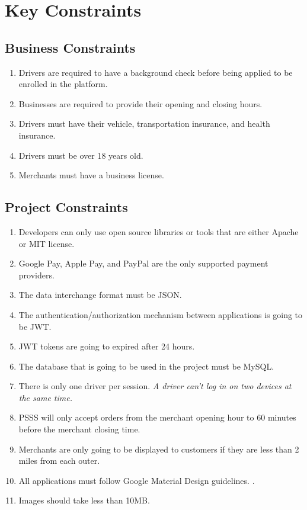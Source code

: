 \section{Key Constraints}
\subsection{Business Constraints}
\begin{enumerate}[label=CON-\arabic*]
    \item Drivers are required to have a background check before being applied to be enrolled in the platform.
    \item Businesses are required to provide their opening and closing hours.
    \item Drivers must have their vehicle, transportation insurance, and health insurance.
    \item Drivers must be over 18 years old.
    \item Merchants must have a business license.
\end{enumerate}
\subsection{Project Constraints}
\begin{enumerate}[resume, label=CON-\arabic*]
    \item Developers can only use open source libraries or tools that are 
    either Apache or MIT license.
    \item Google Pay, Apple Pay, and PayPal are the only supported payment 
    providers.
    \item The data interchange format must be JSON.
    \item The authentication/authorization mechanism between applications is 
    going to be JWT.
    \item JWT tokens are going to expired after 24 hours.
    \item The database that is going to be used in the project must be MySQL.
    \item There is only one driver per session. \textit{A driver can't log in 
    on two devices at the same time.}
    \item PSSS will only accept orders from the merchant opening hour to 60 
    minutes before the merchant closing time.
    \item Merchants are only going to be displayed to customers if they are 
    less than 2 miles from each outer.
    \item All applications must follow Google Material Design 
    guidelines. \cite{material-design-guidelines}.
    \item Images should take less than 10MB.
\end{enumerate}
